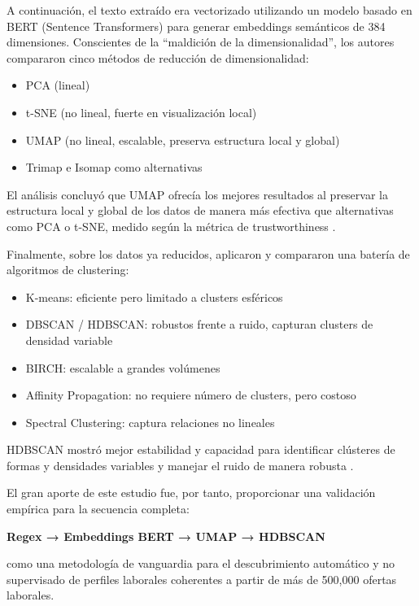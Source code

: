 A continuación, el texto extraído era vectorizado utilizando un modelo basado en BERT (Sentence Transformers) para generar embeddings semánticos de 384 dimensiones. Conscientes de la ``maldición de la dimensionalidad'', los autores compararon cinco métodos de reducción de dimensionalidad:

\begin{itemize}
    \item PCA (lineal)
    \item t-SNE (no lineal, fuerte en visualización local)
    \item UMAP (no lineal, escalable, preserva estructura local y global)
    \item Trimap e Isomap como alternativas
\end{itemize}

El análisis concluyó que UMAP ofrecía los mejores resultados al preservar la estructura local y global de los datos de manera más efectiva que alternativas como PCA o t-SNE, medido según la métrica de trustworthiness \cite{lukauskas2023}.

Finalmente, sobre los datos ya reducidos, aplicaron y compararon una batería de algoritmos de clustering:

\begin{itemize}
    \item K-means: eficiente pero limitado a clusters esféricos
    \item DBSCAN / HDBSCAN: robustos frente a ruido, capturan clusters de densidad variable
    \item BIRCH: escalable a grandes volúmenes
    \item Affinity Propagation: no requiere número de clusters, pero costoso
    \item Spectral Clustering: captura relaciones no lineales
\end{itemize}

HDBSCAN mostró mejor estabilidad y capacidad para identificar clústeres de formas y densidades variables y manejar el ruido de manera robusta \cite{lukauskas2023}.

El gran aporte de este estudio fue, por tanto, proporcionar una validación empírica para la secuencia completa:

\textbf{Regex → Embeddings BERT → UMAP → HDBSCAN}

como una metodología de vanguardia para el descubrimiento automático y no supervisado de perfiles laborales coherentes a partir de más de 500,000 ofertas laborales.

